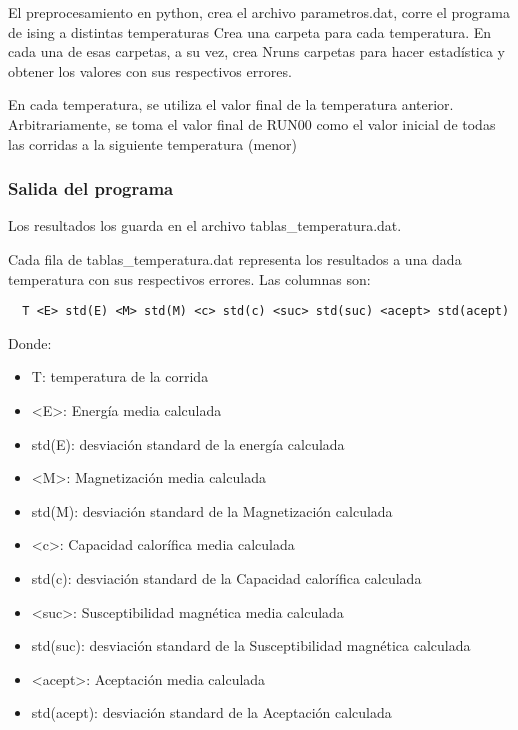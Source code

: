 El preprocesamiento en python, crea el archivo parametros.dat, 
 corre el programa de ising a distintas temperaturas
  Crea una carpeta para cada temperatura. En cada una de esas carpetas, a su
  vez, crea Nruns carpetas para hacer estadística y obtener los valores con
  sus respectivos errores.
 
  En cada temperatura, se utiliza el valor final de la temperatura anterior.
  Arbitrariamente, se toma el valor final de RUN00 como el valor inicial de
  todas las corridas a la siguiente temperatura (menor)
 

\subsubsection{Salida del programa}

Los resultados los guarda en el archivo tablas\_temperatura.dat.

Cada fila de tablas\_temperatura.dat representa los resultados a una dada
temperatura con sus respectivos errores. Las columnas son:

\begin{verbatim}
  T <E> std(E) <M> std(M) <c> std(c) <suc> std(suc) <acept> std(acept)
\end{verbatim}

Donde:



\begin{itemize}
  \item T: temperatura de la corrida 
    \item <E>: Energ\'ia media calculada
    \item  std(E): desviaci\'on standard de la energ\'ia calculada

    \item <M>: Magnetizaci\'on media calculada
    \item  std(M): desviaci\'on standard de la Magnetizaci\'on calculada


    \item <c>: Capacidad calor\'ifica media calculada
    \item  std(c): desviaci\'on standard de la Capacidad calor\'ifica calculada

    \item <suc>: Susceptibilidad magn\'etica media calculada
    \item  std(suc): desviaci\'on standard de la Susceptibilidad magn\'etica calculada


    \item <acept>: Aceptaci\'on media calculada
    \item  std(acept): desviaci\'on standard de la Aceptaci\'on calculada
\end{itemize}



